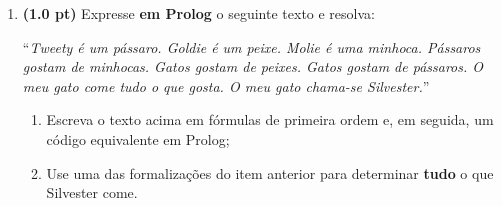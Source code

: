 \documentclass[11pt, a4paper,final]{article}
\begin{document}
\begin{enumerate}


\begin{comment}
\item {\bf (1.5 pts)} No mundo do {\em faz de conta}, há uma
companhia aérea que apresenta vôos entre diferentes
aeroportos. Os vôos podem ser diretos ou com conexão.
Seja o mapa de vôos diretos:


\begin{center}
\begin{tabular}{cc}
1. voo\_direto(a,b) & \hskip 2cm 2. voo\_direto(a,c)\\
3. voo\_direto(b,d) & \hskip 2cm 4. voo\_direto(c,e)\\
5. voo\_direto(d,f) & \hskip 2cm 6. voo\_direto(e,f)\\
7. voo\_direto(a,g) & \hskip 2cm 8. voo\_direto(g,h)\\
9. voo\_direto(h,f) & \hskip 2cm 10. voo\_direto(h,e)\\
\end{tabular}
\end{center}

Dada as regras de conexão abaixo, demonstre  que existe uma possível
conexão  entre os aeroportos  $a$ até $f$.
\begin{description}
\setlength{\itemsep}{-2pt}
  \item[11.]  $\forall x \forall y \forall z ( conexao(x,z) \wedge voo\_direto(z,y) \rightarrow  conexao(x,y) )$
\item[12.] $\forall x \forall y (voo\_direto(x,y)  \rightarrow  conexao(x,y) )$
\end{description}
\end{comment}

\item {\bf (1.0 pt)} Expresse {\bf em Prolog} o seguinte texto e resolva: 

``\textit{Tweety  é um pássaro. Goldie  é um peixe. Molie é uma minhoca. Pássaros gostam de minhocas. Gatos gostam de peixes. Gatos gostam de pássaros.
 O meu gato come tudo o que gosta. O meu gato chama-se Silvester.}''


\begin{enumerate}
  \item Escreva o texto acima em fórmulas de primeira ordem e, em seguida, um código equivalente em Prolog;
 \item Use uma das formalizações do item anterior para determinar {\bf tudo} o que Silvester come.
\end{enumerate}


\end{enumerate}
\end{document}
